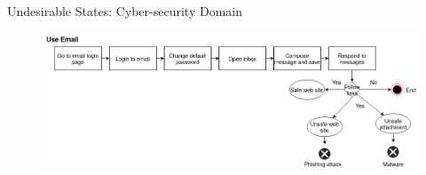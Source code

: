 \begin{frame}{Undesirable States: Cyber-security Domain}

\begin{figure}[ht]
  \centering
\includegraphics[width=\columnwidth, keepaspectratio=true]{img/Tasks.png}
\end{figure}

\end{frame}
